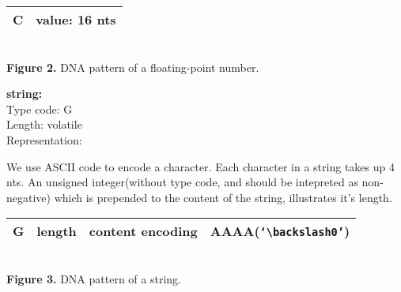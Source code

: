 \documentclass{article}
\begin{document}
%

\begin{center}
    \begin{tabular}{|c|c|}
        \hline
        C & value: 16 nts \\
        \hline
    \end{tabular}
    \\[3pt]{\small \textbf{Figure 2.} DNA pattern of a floating-point number.}
\end{center}
\textbf{string:}\\
Type code: G\\
Length: volatile\\
Representation:
\par We use ASCII code to encode a character. Each character in a string takes up 4 nts. An unsigned integer(without type code, and should be intepreted as non-negative) which is prepended to the content of the string, illustrates it's length.
\begin{center}
    \begin{tabular}{|c|c|c|c|}
        \hline
        G & length & content encoding & AAAA(\texttt{`$\backslash$0'})\\
        \hline
    \end{tabular}
    \\[3pt]{\small \textbf{Figure 3.} DNA pattern of a string.}
\end{center}
\end{document}
